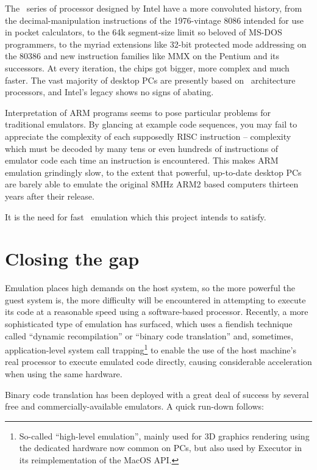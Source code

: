 The \ia\ series of processor designed by Intel have a more convoluted history, from the decimal-manipulation instructions of the 1976-vintage 8086 intended for use in pocket calculators, to the 64k segment-size limit so beloved of MS-DOS programmers, to the myriad extensions like 32-bit protected mode addressing on the 80386 and new instruction families like MMX on the Pentium and its successors. At every iteration, the chips got bigger, more complex and much faster. The vast majority of desktop PCs are presently based on \ia\ architecture processors, and Intel's legacy shows no signs of abating.

Interpretation of ARM programs seems to pose particular problems for traditional emulators. By glancing at example code sequences, you may fail to appreciate the complexity of each supposedly RISC instruction -- complexity which must be decoded by many tens or even hundreds of instructions of emulator code each time an instruction is encountered. This makes ARM emulation grindingly slow, to the extent that powerful, up-to-date desktop PCs are barely able to emulate the original 8MHz ARM2 based computers thirteen years after their release.

It is the need for fast \arm\ emulation which this project intends to satisfy.

\section{Closing the gap}

Emulation places high demands on the host system, so the more powerful the guest system is, the more difficulty will be encountered in attempting to execute its code at a reasonable speed using a software-based processor. Recently, a more sophisticated type of emulation has surfaced, which uses a fiendish technique called ``dynamic recompilation'' or ``binary code translation'' and, sometimes, application-level system call trapping\footnote{So-called ``high-level emulation'', mainly used for 3D graphics rendering using the dedicated hardware now common on PCs, but also used by Executor in its reimplementation of the MacOS API.} to enable the use of the host machine's real processor to execute emulated code directly, causing considerable acceleration when using the same hardware.

Binary code translation has been deployed with a great deal of success by several free and commercially-available emulators. A quick run-down follows:

